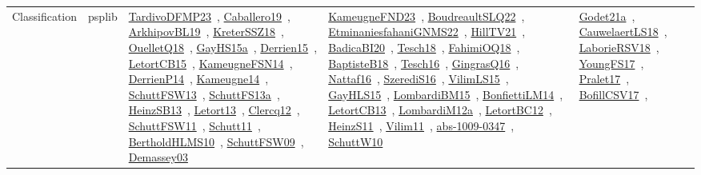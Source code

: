 {\begin{longtable}{lp{3cm}>{\raggedright\arraybackslash}p{6cm}>{\raggedright\arraybackslash}p{6cm}>{\raggedright\arraybackslash}p{8cm}}
Classification & psplib & \href{../works/TardivoDFMP23.pdf}{TardivoDFMP23}~\cite{TardivoDFMP23}, \href{../works/Caballero19.pdf}{Caballero19}~\cite{Caballero19}, \href{../works/ArkhipovBL19.pdf}{ArkhipovBL19}~\cite{ArkhipovBL19}, \href{../works/KreterSSZ18.pdf}{KreterSSZ18}~\cite{KreterSSZ18}, \href{../works/OuelletQ18.pdf}{OuelletQ18}~\cite{OuelletQ18}, \href{../works/GayHS15a.pdf}{GayHS15a}~\cite{GayHS15a}, \href{../works/Derrien15.pdf}{Derrien15}~\cite{Derrien15}, \href{../works/LetortCB15.pdf}{LetortCB15}~\cite{LetortCB15}, \href{../works/KameugneFSN14.pdf}{KameugneFSN14}~\cite{KameugneFSN14}, \href{../works/DerrienP14.pdf}{DerrienP14}~\cite{DerrienP14}, \href{../works/Kameugne14.pdf}{Kameugne14}~\cite{Kameugne14}, \href{../works/SchuttFSW13.pdf}{SchuttFSW13}~\cite{SchuttFSW13}, \href{../works/SchuttFS13a.pdf}{SchuttFS13a}~\cite{SchuttFS13a}, \href{../works/HeinzSB13.pdf}{HeinzSB13}~\cite{HeinzSB13}, \href{../works/Letort13.pdf}{Letort13}~\cite{Letort13}, \href{../works/Clercq12.pdf}{Clercq12}~\cite{Clercq12}, \href{../works/SchuttFSW11.pdf}{SchuttFSW11}~\cite{SchuttFSW11}, \href{../works/Schutt11.pdf}{Schutt11}~\cite{Schutt11}, \href{../works/BertholdHLMS10.pdf}{BertholdHLMS10}~\cite{BertholdHLMS10}, \href{../works/SchuttFSW09.pdf}{SchuttFSW09}~\cite{SchuttFSW09}, \href{../works/Demassey03.pdf}{Demassey03}~\cite{Demassey03} & \href{../works/KameugneFND23.pdf}{KameugneFND23}~\cite{KameugneFND23}, \href{../works/BoudreaultSLQ22.pdf}{BoudreaultSLQ22}~\cite{BoudreaultSLQ22}, \href{../works/EtminaniesfahaniGNMS22.pdf}{EtminaniesfahaniGNMS22}~\cite{EtminaniesfahaniGNMS22}, \href{../works/HillTV21.pdf}{HillTV21}~\cite{HillTV21}, \href{../works/BadicaBI20.pdf}{BadicaBI20}~\cite{BadicaBI20}, \href{../works/Tesch18.pdf}{Tesch18}~\cite{Tesch18}, \href{../works/FahimiOQ18.pdf}{FahimiOQ18}~\cite{FahimiOQ18}, \href{../works/BaptisteB18.pdf}{BaptisteB18}~\cite{BaptisteB18}, \href{../works/Tesch16.pdf}{Tesch16}~\cite{Tesch16}, \href{../works/GingrasQ16.pdf}{GingrasQ16}~\cite{GingrasQ16}, \href{../works/Nattaf16.pdf}{Nattaf16}~\cite{Nattaf16}, \href{../works/SzerediS16.pdf}{SzerediS16}~\cite{SzerediS16}, \href{../works/VilimLS15.pdf}{VilimLS15}~\cite{VilimLS15}, \href{../works/GayHLS15.pdf}{GayHLS15}~\cite{GayHLS15}, \href{../works/LombardiBM15.pdf}{LombardiBM15}~\cite{LombardiBM15}, \href{../works/BonfiettiLM14.pdf}{BonfiettiLM14}~\cite{BonfiettiLM14}, \href{../works/LetortCB13.pdf}{LetortCB13}~\cite{LetortCB13}, \href{../works/LombardiM12a.pdf}{LombardiM12a}~\cite{LombardiM12a}, \href{../works/LetortBC12.pdf}{LetortBC12}~\cite{LetortBC12}, \href{../works/HeinzS11.pdf}{HeinzS11}~\cite{HeinzS11}, \href{../works/Vilim11.pdf}{Vilim11}~\cite{Vilim11}, \href{../works/abs-1009-0347.pdf}{abs-1009-0347}~\cite{abs-1009-0347}, \href{../works/SchuttW10.pdf}{SchuttW10}~\cite{SchuttW10} & \href{../works/Godet21a.pdf}{Godet21a}~\cite{Godet21a}, \href{../works/CauwelaertLS18.pdf}{CauwelaertLS18}~\cite{CauwelaertLS18}, \href{../works/LaborieRSV18.pdf}{LaborieRSV18}~\cite{LaborieRSV18}, \href{../works/YoungFS17.pdf}{YoungFS17}~\cite{YoungFS17}, \href{../works/Pralet17.pdf}{Pralet17}~\cite{Pralet17}, \href{../works/BofillCSV17.pdf}{BofillCSV17}~\cite{BofillCSV17}, 
\end{longtable}}
